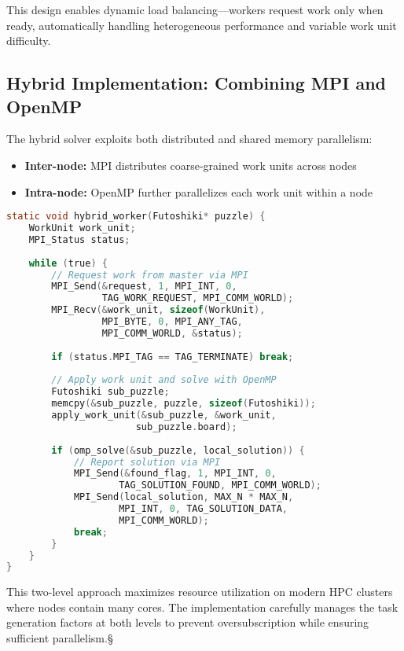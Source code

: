This design enables dynamic load balancing—workers request work only when ready, automatically handling heterogeneous performance and variable work unit difficulty.

\subsection{Hybrid Implementation: Combining MPI and OpenMP}
The hybrid solver exploits both distributed and shared memory parallelism:

\begin{itemize}
    \item \textbf{Inter-node:} MPI distributes coarse-grained work units across nodes
    \item \textbf{Intra-node:} OpenMP further parallelizes each work unit within a node
\end{itemize}

\begin{lstlisting}[language=C, caption=Hybrid worker with nested parallelism]
static void hybrid_worker(Futoshiki* puzzle) {
    WorkUnit work_unit;
    MPI_Status status;
    
    while (true) {
        // Request work from master via MPI
        MPI_Send(&request, 1, MPI_INT, 0, 
                 TAG_WORK_REQUEST, MPI_COMM_WORLD);
        MPI_Recv(&work_unit, sizeof(WorkUnit), 
                 MPI_BYTE, 0, MPI_ANY_TAG, 
                 MPI_COMM_WORLD, &status);
        
        if (status.MPI_TAG == TAG_TERMINATE) break;
        
        // Apply work unit and solve with OpenMP
        Futoshiki sub_puzzle;
        memcpy(&sub_puzzle, puzzle, sizeof(Futoshiki));
        apply_work_unit(&sub_puzzle, &work_unit, 
                       sub_puzzle.board);
        
        if (omp_solve(&sub_puzzle, local_solution)) {
            // Report solution via MPI
            MPI_Send(&found_flag, 1, MPI_INT, 0, 
                    TAG_SOLUTION_FOUND, MPI_COMM_WORLD);
            MPI_Send(local_solution, MAX_N * MAX_N, 
                    MPI_INT, 0, TAG_SOLUTION_DATA, 
                    MPI_COMM_WORLD);
            break;
        }
    }
}
\end{lstlisting}

This two-level approach maximizes resource utilization on modern HPC clusters where nodes contain many cores. The implementation carefully manages the task generation factors at both levels to prevent oversubscription while ensuring sufficient parallelism.§